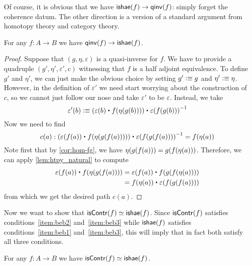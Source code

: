 Of course, it is obvious that we have $\mathsf{ishae}(f) \to\mathsf{qinv}(f)$: simply forget the coherence datum.
The other direction is a version of a standard argument from homotopy theory and category theory.

\begin{thm}\label{thm:equiv-iso-adj}
  For any $f:A\to B$ we have $\mathsf{qinv}(f)\to\mathsf{ishae}(f)$.
\end{thm}
\begin{proof}
Suppose that $(g,\eta,\varepsilon)$ is a quasi-inverse for $f$. We have to provide
a quadruple $(g',\eta',\varepsilon',c)$ witnessing that $f$ is a half adjoint equivalence. To
define $g'$ and $\eta'$, we can just make the obvious choice by setting $g'
\vcentcolon\equiv g$ and $\eta'\vcentcolon\equiv \eta$. However, in the definition of $\varepsilon'$ we
need start worrying about the construction of $c$, so we cannot just follow our nose
and take $\varepsilon'$ to be $\varepsilon$. Instead, we take
\begin{equation*}
\varepsilon'(b) \defeq (\varepsilon(b)\ct \ap{f}{\eta(g(b))})\ct \opp{\varepsilon(f(g(b)))}
\end{equation*}
Now we need to find
\begin{equation*}
c(a):(\varepsilon(f(a))\ct \ap{f}{\eta(g(f(a)))})\ct \opp{\varepsilon(f(g(f(a))))}=\ap{f}{\eta(a)}
\end{equation*}
Note first that by \autoref{cor:hom-fg}, we have 
$\eta(g(f(a)))={g}\!\left({{f}\!\left({\eta(a)}\right)}\right)$. Therefore, we can apply
\autoref{lem:htpy_natural} to compute
\begin{align*}
\varepsilon(f(a))\ct \ap{f}{\eta(g(f(a)))}
& = \varepsilon(f(a))\ct \ap{f}{\ap{g}{\ap{f}{\eta(a)}}}\\
& = \ap{f}{\eta(a)}\ct\varepsilon(f(g(f(a))))
\end{align*}
from which we get the desired path $c(a)$.
\end{proof}

Now we want to show that $\mathsf{isContr}(f) \simeq \mathsf{ishae}(f)$.
Since $\mathsf{isContr}(f)$ satisfies conditions~\ref{item:beb2} and~\ref{item:beb3} while $\mathsf{ishae}(f)$ satisfies conditions~\ref{item:beb1} and~\ref{item:beb3}, this will imply that in fact both satisfy all three conditions.

\begin{thm}\label{thm:equiv-contr-hae}
  For any $f:A\to B$ we have $\mathsf{isContr}(f) \simeq \mathsf{ishae}(f)$.
\end{thm}

